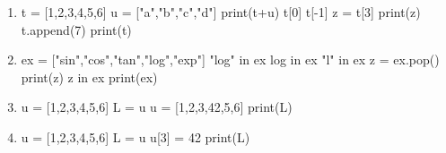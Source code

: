 
\begin{enumerate}[label=\emph{\alph*)}]
\item 
\begin{pyverbatim}
t = [1,2,3,4,5,6]
u = ["a","b","c","d"]
print(t+u)
t[0]
t[-1]
z = t[3]
print(z)
t.append(7)
print(t)
\end{pyverbatim}
\item 
\begin{pyverbatim}
ex = ["sin","cos","tan","log","exp"]
"log" in ex
log in ex
"l" in ex
z = ex.pop()
print(z)
z in ex
print(ex)
\end{pyverbatim}
\item 
\begin{pyverbatim}
  u = [1,2,3,4,5,6]
  L = u
  u = [1,2,3,42,5,6]
  print(L)
\end{pyverbatim}
\item 
\begin{pyverbatim}
  u = [1,2,3,4,5,6]
  L = u
  u[3] = 42
  print(L)
\end{pyverbatim}
\end{enumerate}